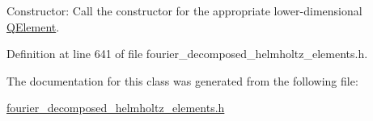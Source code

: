 Constructor\+: Call the constructor for the appropriate lower-\/dimensional \hyperlink{classoomph_1_1QElement}{Q\+Element}. 



Definition at line 641 of file fourier\+\_\+decomposed\+\_\+helmholtz\+\_\+elements.\+h.



The documentation for this class was generated from the following file\+:\begin{DoxyCompactItemize}
\item 
\hyperlink{fourier__decomposed__helmholtz__elements_8h}{fourier\+\_\+decomposed\+\_\+helmholtz\+\_\+elements.\+h}\end{DoxyCompactItemize}
